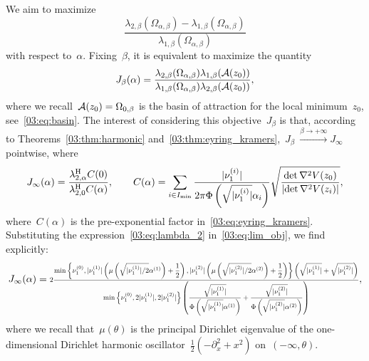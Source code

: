 We aim to maximize
$$\frac{\lambda_{2,\beta}(\Omega_{\alpha,\beta})-\lambda_{1,\beta}(\Omega_{\alpha,\beta})}{\lambda_{1,\beta}(\Omega_{\alpha,\beta})}$$ with respect to~$\alpha$.
Fixing~$\beta$, it is equivalent to maximize the quantity
\begin{equation}
    \label{03:eq:reduced_obj}
    J_\beta(\alpha) = \frac{\lambda_{2,\beta}(\Omega_{\alpha,\beta})\lambda_{1,\beta}(\mathcal{A}(z_0))}{\lambda_{1,\beta}(\Omega_{\alpha,\beta})\lambda_{2,\beta}(\mathcal{A}(z_0))},
\end{equation}
where we recall~$\mathcal{A}(z_0) = \Omega_{0,\beta}$ is the basin of attraction for the local minimum~$z_0$, see~\eqref{03:eq:basin}. The interest of considering this objective~$J_\beta$ is that, according to Theorems~\ref{03:thm:harmonic} and~\ref{03:thm:eyring_kramers},~$J_\beta~\xrightarrow{\beta\to+\infty}J_\infty$ pointwise, where
\begin{equation}
    \label{03:eq:lim_obj}
        J_\infty(\alpha) = \frac{\lambda_{2,\alpha}^{\mathrm{H}}C(0)}{\lambda_{2,0}^{\mathrm{H}}C(\alpha)},\qquad C(\alpha)=\sum_{i\in I_{\min}}\frac{|\nu^{(i)}_{1}|}{2\pi\Phi\left(\sqrt{|\nu^{(i)}_{1}|}\alpha_i\right)}\sqrt{\frac{\det \nabla^2 V(z_0)}{\left|\det \nabla ^2 V(z_i)\right|}},
\end{equation}
where~$C(\alpha)$ is the pre-exponential factor in~\eqref{03:eq:eyring_kramers}. Substituting the expression~\eqref{03:eq:lambda_2} in~\eqref{03:eq:lim_obj}, we find explicitly:
\begin{equation}
    \label{03:eq:lim_obj_explicit}
    J_\infty(\alpha)=\resizebox{.9\hsize}{!}{$2\displaystyle\frac{\min\left\{\hessEigval{0}{1},|\hessEigval{1}{1}|\left(\mu\left(\sqrt{|\hessEigval{1}{1}|/2}\epsLimit{1}\right)+\displaystyle\frac12\right),|\hessEigval{2}{1}|\left(\mu\left(\sqrt{|\hessEigval{2}{1}|/2}\epsLimit{2}\right)+\displaystyle\frac12\right)\right\}\left(\sqrt{|\hessEigval{1}{1}|}+\sqrt{|\hessEigval{2}{1}|}\right)}{\min\left\{\hessEigval{0}{1},2|\hessEigval{1}{1}|,2|\hessEigval{2}{1}|\right\}\left(\displaystyle\frac{\sqrt{|\hessEigval{1}{1}|}}{\Phi\left(\sqrt{|\hessEigval{1}{1}|}\epsLimit{1}\right)}+\displaystyle\frac{\sqrt{|\hessEigval{2}{1}|}}{\Phi\left(\sqrt{|\hessEigval{2}{1}|}\epsLimit{2}\right)}\right)}$},
\end{equation}
where we recall that~$\mu(\theta)$ is the principal Dirichlet eigenvalue of the one-dimensional Dirichlet harmonic oscillator~$\frac12(-\partial_x^2+x^2)$ on~$(-\infty,\theta)$.

